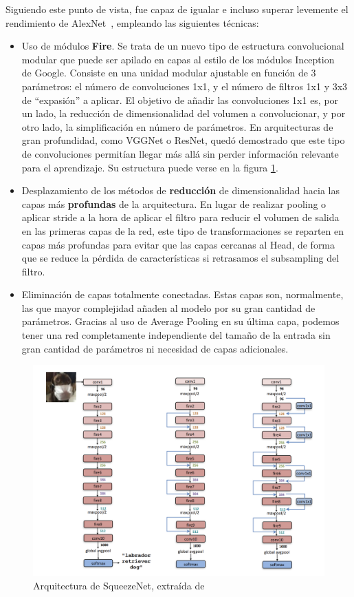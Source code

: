 Siguiendo este punto de vista, fue capaz de igualar e incluso superar levemente el rendimiento de AlexNet~\cite{NIPS2012_c399862d}, empleando las siguientes técnicas:
\begin{itemize}
    \item Uso de módulos \textbf{Fire}. Se trata de un nuevo tipo de estructura convolucional modular que puede ser apilado en capas al estilo de los módulos Inception ~\cite{szegedy2014going} de Google. Consiste en una unidad modular ajustable en función de 3 parámetros: el número de convoluciones 1x1, y el número de filtros 1x1 y 3x3 de ``expasión'' a aplicar. El objetivo de añadir las convoluciones 1x1 es, por un lado, la reducción de dimensionalidad del volumen a convolucionar, y por otro lado, la simplificación en número de parámetros. En arquitecturas de gran profundidad, como VGGNet o ResNet, quedó demostrado que este tipo de convoluciones permitían llegar más allá sin perder información relevante para el aprendizaje. Su estructura puede verse en la figura \ref{figsqueeze}.
    \item Desplazamiento de los métodos de \textbf{reducción} de dimensionalidad hacia las capas más \textbf{profundas} de la arquitectura. En lugar de realizar pooling o aplicar stride a la hora de aplicar el filtro para reducir el volumen de salida en las primeras capas de la red, este tipo de transformaciones se reparten en capas más profundas para evitar que las capas cercanas al Head, de forma que se reduce la pérdida de características si retrasamos el subsampling del filtro.
    \item Eliminación de capas totalmente conectadas. Estas capas son, normalmente, las que mayor complejidad añaden al modelo por su gran cantidad de parámetros. Gracias al uso de Average Pooling en su última capa, podemos tener una red completamente independiente del tamaño de la entrada sin gran cantidad de parámetros ni necesidad de capas adicionales.
\end{itemize}

\begin{figure}[H]
	\centering
	\includegraphics[scale = 0.2]{imagenes/squeezenet.png}
	\caption{Arquitectura de SqueezeNet, extraída de \cite{iandola2016squeezenet}}
		\label{figsqueeze}
\end{figure}


